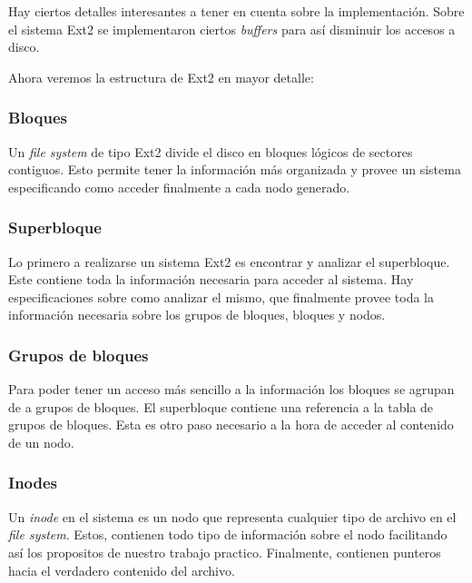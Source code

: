 \documentclass[a4paper,10pt]{article}
\begin{document}
    Hay ciertos detalles interesantes a tener en cuenta sobre la implementación. Sobre el sistema Ext2 se implementaron
    ciertos \textit{buffers} para así disminuir los accesos a disco.

    Ahora veremos la estructura de Ext2 en mayor detalle:

        \subsubsection{Bloques}

        Un \textit{file system} de tipo Ext2 divide el disco en bloques lógicos de sectores contiguos. Esto permite
        tener la información más organizada y provee un sistema especificando como acceder finalmente a cada nodo
        generado.

        \subsubsection{Superbloque}

        Lo primero a realizarse un sistema Ext2 es encontrar y analizar el superbloque. Este contiene toda la información
        necesaria para acceder al sistema. Hay especificaciones sobre como analizar el mismo, que finalmente provee
        toda la información necesaria sobre los grupos de bloques, bloques y nodos.

        \subsubsection{Grupos de bloques}
        
        Para poder tener un acceso más sencillo a la información los bloques se agrupan de a grupos de bloques.
        El superbloque contiene una referencia a la tabla de grupos de bloques. Esta es otro paso necesario a la hora
        de acceder al contenido de un nodo.

        \subsubsection{Inodes}
    
        Un \textit{inode} en el sistema es un nodo que representa cualquier tipo de archivo en el \textit{file system}.
        Estos, contienen todo tipo de información sobre el nodo facilitando así los propositos de nuestro trabajo
        practico. Finalmente, contienen punteros hacia el verdadero contenido del archivo.
\end{document}
